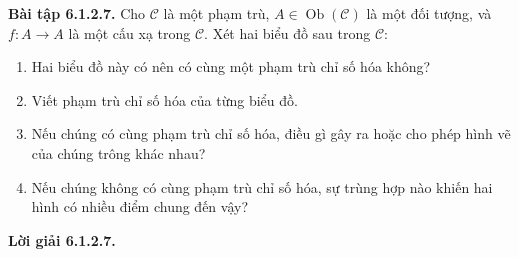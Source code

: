 \noindent\textbf{Bài tập 6.1.2.7.} Cho $\mathcal C$ là một phạm trù, $A\in\operatorname{Ob}(\mathcal C)$ là một đối tượng, và $f:A\to A$ là một cấu xạ trong $\mathcal C$. Xét hai biểu đồ sau trong $\mathcal C$:
\begin{center}\end{center}
\begin{enumerate}[label=\alph*.]
\item Hai biểu đồ này có nên có cùng một phạm trù chỉ số hóa không?
\item Viết phạm trù chỉ số hóa của từng biểu đồ.
\item Nếu chúng có cùng phạm trù chỉ số hóa, điều gì gây ra hoặc cho phép hình vẽ của chúng trông khác nhau?
\item Nếu chúng không có cùng phạm trù chỉ số hóa, sự trùng hợp nào khiến hai hình có nhiều điểm chung đến vậy?
\end{enumerate}
\noindent\textbf{Lời giải 6.1.2.7.}\keepwithnext
